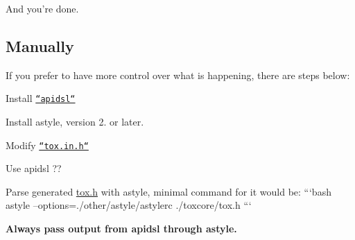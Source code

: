 And you're done.

\subsection*{Manually}

If you prefer to have more control over what is happening, there are steps below\+:


\begin{DoxyEnumerate}
\item Install \href{https://github.com/iphydf/apidsl}{\tt ``apidsl``}
\item Install {\ttfamily astyle}, version 2. or later.
\item Modify \href{/other/apidsl/tox.in.h}{\tt ``tox.in.\+h``}
\item Use {\ttfamily apidsl} {\ttfamily ??}
\item Parse generated {\ttfamily \hyperlink{tox_8h}{tox.\+h}} with astyle, minimal command for it would be\+: ```bash astyle --options=./other/astyle/astylerc ./toxcore/tox.h ```
\end{DoxyEnumerate}

{\bfseries Always pass output from {\ttfamily apidsl} through astyle.} 